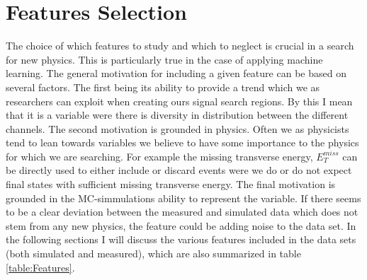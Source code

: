 \section{Features Selection}
The choice of which features to study and which to neglect is crucial in a search for new physics. This is particularly true 
in the case of applying machine learning. The general motivation for including a given feature can be based on several factors. 
The first being its ability to provide a trend which we as researchers can exploit when creating ours signal search regions. By this I mean
that it is a variable were there is diversity in distribution between the different channels. The second motivation is grounded in 
physics. Often we as physicists tend to lean towards variables we believe to have some importance to the physics for which we are searching. For 
example the missing transverse energy, $E_T^{miss}$ can be directly used to either include or discard events were we do or do not expect final states
with sufficient missing transverse energy. The final motivation is grounded in the \ac{MC}-simmulations ability to represent the variable.
If there seems to be a clear deviation between the measured and simulated data which does not stem from any new physics, the feature could be 
adding noise to the data set. In the following sections I will discuss the various features included in the data sets (both simulated and measured),
which are also summarized in table \ref{table:Features}.